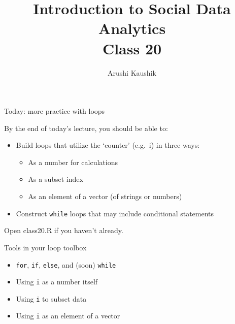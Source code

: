 \documentclass[ignorenonframetext,]{beamer}
\title[Class 20]{Introduction to Social Data Analytics\\
	Class 20}
\author[Kaushik]{Arushi Kaushik}
\institute[UCSD]{arkaushi@ucsd.edu}
\providecommand{\tightlist}{%
	\setlength{\itemsep}{0pt}\setlength{\parskip}{0pt}}
\begin{document}
\frame{\titlepage}

\begin{frame}[fragile]{Today: more practice with loops}

By the end of today's lecture, you should be able to:

\begin{itemize}
\tightlist
\item
  Build loops that utilize the `counter' (e.g.~i) in three ways:

  \begin{itemize}
  \tightlist
  \item
    As a number for calculations
  \item
    As a subset index
  \item
    As an element of a vector (of strings or numbers)
  \end{itemize}
\item
  Construct \texttt{while} loops that may include conditional statements
\end{itemize}

Open class20.R if you haven't already.

\end{frame}

\begin{frame}[fragile]{Tools in your loop toolbox}

\begin{itemize}
\tightlist
\item
  \texttt{for}, \texttt{if}, \texttt{else}, and (soon) \texttt{while}
\item
  Using \texttt{i} as a number itself
\item
  Using \texttt{i} to subset data
\item
  Using \texttt{i} as an element of a vector
\end{itemize}

\end{frame}
\end{document}
